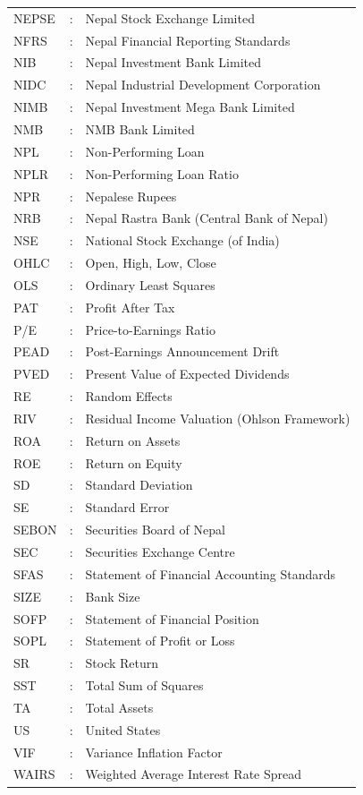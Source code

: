\begin{longtable}{@{}>{\setstretch{1.4276}}p{60pt}>{\setstretch{1.4276}}p{24pt}>{\setstretch{1.4276}}p{\dimexpr\textwidth-108pt\relax}@{}}
NEPSE & : & Nepal Stock Exchange Limited \\
NFRS & : & Nepal Financial Reporting Standards \\
NIB & : & Nepal Investment Bank Limited \\
NIDC & : & Nepal Industrial Development Corporation \\
NIMB & : & Nepal Investment Mega Bank Limited \\
NMB & : & NMB Bank Limited \\
NPL & : & Non-Performing Loan \\
NPLR & : & Non-Performing Loan Ratio \\
NPR & : & Nepalese Rupees \\
NRB & : & Nepal Rastra Bank (Central Bank of Nepal) \\
NSE & : & National Stock Exchange (of India) \\
OHLC & : & Open, High, Low, Close \\
OLS & : & Ordinary Least Squares \\
PAT & : & Profit After Tax \\
P/E & : & Price-to-Earnings Ratio \\
PEAD & : & Post-Earnings Announcement Drift \\
PVED & : & Present Value of Expected Dividends \\
RE & : & Random Effects \\
RIV & : & Residual Income Valuation (Ohlson Framework) \\
ROA & : & Return on Assets \\
ROE & : & Return on Equity \\
SD & : & Standard Deviation \\
SE & : & Standard Error \\
SEBON & : & Securities Board of Nepal \\
SEC & : & Securities Exchange Centre \\
SFAS & : & Statement of Financial Accounting Standards \\
SIZE & : & Bank Size \\
SOFP & : & Statement of Financial Position \\
SOPL & : & Statement of Profit or Loss \\
SR & : & Stock Return \\
SST & : & Total Sum of Squares \\
TA & : & Total Assets \\
US & : & United States \\
VIF & : & Variance Inflation Factor \\
WAIRS & : & Weighted Average Interest Rate Spread \\
\end{longtable}
\addtocounter{table}{-1}
\endgroup
